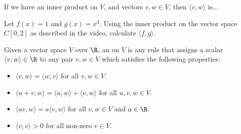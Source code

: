 \endedxtext


\endedxvertical










If we have an inner product on $V$, and vectors $v,w \in V$, then $\langle v, w\rangle$ is...



\endedxproblem


Let $f(x) = 1$ and $g(x) = x^3$.  
Using the inner product on the vector space $C[0,2]$ as described in the video, 
calculate $\langle f, g \rangle$.  



\edXsolution{
\[ \langle f, g \rangle = \int_0^2 f(x) g(x) \ dx = \int_0^2 x^3 \ dx = \left. \frac{x^4}{4} \right|_0^2 = 4.\]
}

\endedxproblem


\endedxvertical





{} Given a vector space $V$ over $\R$, an {} on $V$ is any
rule that assigns a scalar $\langle v,w\rangle \in \R$ to any pair $v,w\in V$ which satisfies the following
properties:

\begin{itemize}
\item
$\langle v,w \rangle = \langle w,v\rangle$ for all $v,w \in V$.
\item
$\langle u+v,w \rangle = \langle u,w\rangle + \langle v,w\rangle $ for all $u,v,w \in V$.  
\item
$\langle av, w\rangle = a\langle v,w \rangle$ for all $v,w\in V$ and $a\in \R$.  
\item
$\langle v,v\rangle > 0$ for all non-zero $v \in V$.  

\end{itemize}

